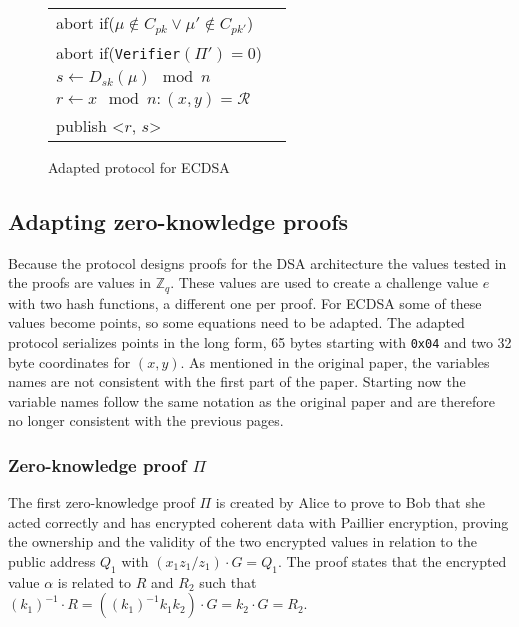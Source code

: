\begin{figure}[H]
\begin{table}[H]
\begin{footnotesize}
{\begin{tabular}{ | l l | }
        abort if($\mu \notin C_{pk} \lor \mu' \notin C_{pk'}$) & \\
        abort if(\texttt{Verifier}$(\Pi') = 0$) & \\
        $s \leftarrow D_{sk}(\mu) \mod n$ & \\
        $r \leftarrow x \mod n : (x,y) = \mathcal{R}$ & \\
        publish <$r$, $s$> & \\
        \hline
      \end{tabular}}
      \end{footnotesize}
    \end{table}

  \caption{Adapted protocol for ECDSA}
  \label{fig:adaptationSchemeECDSA}
\end{figure}

\subsection{Adapting zero-knowledge proofs}

Because the protocol designs proofs for the DSA architecture the values
tested in the proofs are values in $\mathbb{Z}_{q}$. These values are used to
create a challenge value $e$ with two hash functions, a different one per proof. For
ECDSA some of these values become points, so some equations need to be adapted.
The adapted protocol serializes points in the long form, 65 bytes starting with
\texttt{0x04} and two 32 byte coordinates for $(x, y)$. As mentioned in the
original paper, the variables names are not consistent with the first part of
the paper. Starting now the variable names follow the same notation as the
original paper and are therefore no longer consistent with the previous pages.

\subsubsection{Zero-knowledge proof $\Pi$}

The first zero-knowledge proof $\Pi$ is created by Alice to prove to Bob that
she acted correctly and has encrypted coherent data with Paillier encryption,
proving the ownership and the validity of the two encrypted values in relation
to the public address $Q_1$ with $(x_1z_1 / z_1) \cdot G = Q_1$. The proof
states that the encrypted value $\alpha$ is related to $R$ and $R_2$ such that
$(k_1)^{-1} \cdot R = ((k_1)^{-1}k_1k_2) \cdot G = k_2 \cdot G = R_2$.

